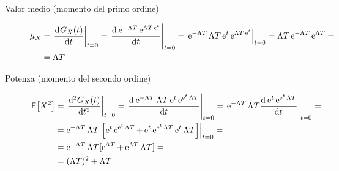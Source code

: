 \begin{description}
\item[Valor medio (momento del primo ordine)]
\begin{equation}
\begin{split}
	\mu_X&=\restrict{\deriv{G_X(t)}{t}}{t=0}=\restrict{\deriv{\e{-\Lambda T}\e{\Lambda T\e{t}}}{t}}{t=0}=\restrict{\e{-\Lambda T}{\Lambda T}\e{t}\e{\Lambda T\e{t}}}{t=0}=\Lambda T \e{-\Lambda T}\e{\Lambda T}=\\
	&=\Lambda T
\end{split}
\end{equation}

\item[Potenza (momento del secondo ordine)]
\begin{equation}
\begin{split}
	\E{X^2}&=\restrict{\deriv[2]{G_X(t)}{t}}{t=0}=
	\restrict{\deriv{\e{-\Lambda T}{\Lambda T}\e{t}\e{\e{t}\Lambda T}}{t}}{t=0}=
	\restrict{\e{-\Lambda T}{\Lambda T}\deriv{\e{t}\e{\e{t}\Lambda T}}{t}}{t=0}=\\
	&={\e{-\Lambda T}\Lambda T}\restrict{\left[\e{t}\e{\e{t}\Lambda T}+\e{t}\e{\e{t}\Lambda T}{\e{t}\Lambda T}\right]}{t=0}=\\
	&={\e{-\Lambda T}\Lambda T}[\e{\Lambda T}+\e{\Lambda T}{\Lambda T}]=\\
	&=(\Lambda T)^2+\Lambda T
\end{split}
\end{equation}
\end{description}

